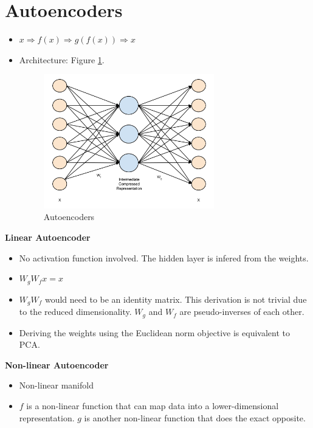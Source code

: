 \documentclass[parskip=half]{scrartcl}
\begin{document}
        


\section{Autoencoders} %
\label{sec:autoencoders}

    \begin{itemize}
        \item 
        $x \Rightarrow f(x) \Rightarrow g(f(x)) \Rightarrow x$
        \item 
        Architecture: Figure \ref{fig:autoencoders}.
        \begin{figure}[ht]
            \centering
            \includegraphics[width=0.7\textwidth]{autoencoders}
            \caption{Autoencoders}
            \label{fig:autoencoders}
        \end{figure}
    \end{itemize}

    \textbf{Linear Autoencoder}
    \begin{itemize}
        \item 
        No activation function involved. The hidden layer is infered from the weights.
        \item 
        $W_g W_f x = x$
        \item 
        $W_g W_f$ would need to be an identity matrix. This derivation is not trivial due to the reduced dimensionality. $W_g$ and $W_f$ are pseudo-inverses of each other.
        \item 
        Deriving the weights using the Euclidean norm objective is equivalent to PCA.
    \end{itemize}

    \textbf{Non-linear Autoencoder}
    \begin{itemize}
        \item 
        Non-linear manifold 
        \item 
        $f$ is a non-linear function that can map data into a lower-dimensional representation. $g$ is another non-linear function that does the exact opposite.
    \end{itemize}
\end{document}
